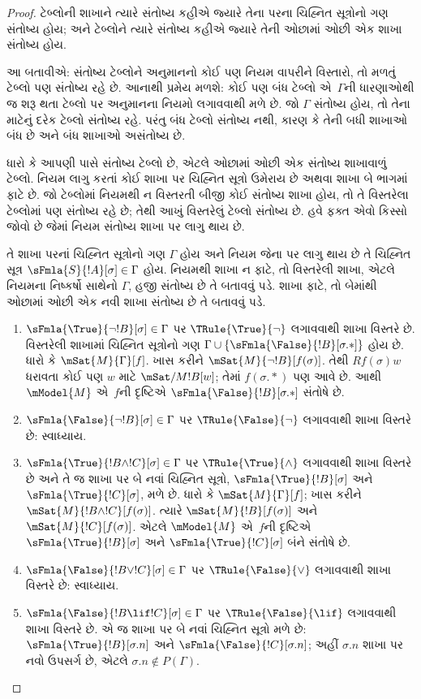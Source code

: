 \begin{proof}
ટેબ્લોની શાખાને ત્યારે સંતોષ્ય કહીએ જ્યારે
તેના પરના ચિહ્નિત સૂત્રોનો ગણ સંતોષ્ય હોય;
અને ટેબ્લોને ત્યારે સંતોષ્ય કહીએ જ્યારે
તેની ઓછામાં ઓછી એક શાખા સંતોષ્ય હોય.

આ બતાવીએ: સંતોષ્ય ટેબ્લોને અનુમાનનો કોઈ પણ
નિયમ વાપરીને વિસ્તારો, તો મળતું ટેબ્લો પણ
સંતોષ્ય રહે છે. આનાથી પ્રમેય મળશે: કોઈ પણ બંધ
ટેબ્લો એ~$\Gamma$ની ધારણાઓથી જ શરૂ થતા
ટેબ્લો પર અનુમાનના નિયમો લગાવવાથી મળે છે.
જો $\Gamma$ સંતોષ્ય હોય, તો તેના માટેનું દરેક
ટેબ્લો સંતોષ્ય રહે. પરંતુ બંધ ટેબ્લો
સંતોષ્ય નથી, કારણ કે તેની બધી શાખાઓ બંધ છે
અને બંધ શાખાઓ અસંતોષ્ય છે.

ધારો કે આપણી પાસે સંતોષ્ય ટેબ્લો છે,
એટલે ઓછામાં ઓછી એક સંતોષ્ય શાખાવાળું
ટેબ્લો. નિયમ લાગુ કરતાં કોઈ શાખા પર
ચિહ્નિત સૂત્રો ઉમેરાય છે અથવા શાખા
બે ભાગમાં ફાટે છે. જો ટેબ્લોમાં નિયમથી ન વિસ્તરતી
બીજી કોઈ સંતોષ્ય શાખા હોય, તો તે વિસ્તરેલા
ટેબ્લોમાં પણ સંતોષ્ય રહે છે; તેથી આખું
વિસ્તરેલું ટેબ્લો સંતોષ્ય છે. હવે ફક્ત એવો
કિસ્સો જોવો છે જેમાં નિયમ સંતોષ્ય શાખા પર
લાગુ થાય છે.

તે શાખા પરનાં ચિહ્નિત સૂત્રોનો ગણ
$\Gamma$ હોય અને નિયમ જેના પર લાગુ થાય છે તે
ચિહ્નિત સૂત્ર $\sFmla{S}{!A}[\sigma] \in \Gamma$
હોય. નિયમથી શાખા ન ફાટે, તો વિસ્તરેલી શાખા,
એટલે નિયમના નિષ્કર્ષો સાથેનો $\Gamma$,
હજી સંતોષ્ય છે તે બતાવવું પડે. શાખા ફાટે,
તો બેમાંથી ઓછામાં ઓછી એક નવી શાખા સંતોષ્ય
છે તે બતાવવું પડે.
\begin{enumerate}
\item $\sFmla{\True}{\lnot !B}[\sigma] \in \Gamma$
  પર $\TRule{\True}{\lnot}$ લગાવવાથી શાખા
  વિસ્તરે છે. વિસ્તરેલી શાખામાં
  ચિહ્નિત સૂત્રોનો ગણ $\Gamma \cup
  \{\sFmla{\False}{!B}[\sigma.{*}]\}$ હોય છે.
  ધારો કે $\mSat{M}{\Gamma}[f]$. ખાસ કરીને
  $\mSat{M}{\lnot !B}[f(\sigma)]$. તેથી
  $Rf(\sigma)w$ ધરાવતા કોઈ પણ $w$ માટે
  $\mSat/{M}{!B}[w]$; તેમાં $f(\sigma.{*})$
  પણ આવે છે. આથી $\mModel{M}$ એ~$f$ની
  દૃષ્ટિએ $\sFmla{\False}{!B}[\sigma.{*}]$
  સંતોષે છે.
\item $\sFmla{\False}{\lnot !B}[\sigma] \in \Gamma$
  પર $\TRule{\False}{\lnot}$ લગાવવાથી શાખા
  વિસ્તરે છે: સ્વાધ્યાય.
\item $\sFmla{\True}{!B \land !C}[\sigma] \in \Gamma$
  પર $\TRule{\True}{\land}$ લગાવવાથી શાખા
  વિસ્તરે છે અને તે જ શાખા પર બે નવાં
  ચિહ્નિત સૂત્રો, $\sFmla{\True}{!B}[\sigma]$
  અને $\sFmla{\True}{!C}[\sigma]$, મળે છે.
  ધારો કે $\mSat{M}{\Gamma}[f]$; ખાસ કરીને
  $\mSat{M}{!B \land !C}[f(\sigma)]$.
  ત્યારે $\mSat{M}{!B}[f(\sigma)]$ અને
  $\mSat{M}{!C}[f(\sigma)]$. એટલે
  $\mModel{M}$ એ~$f$ની દૃષ્ટિએ
  $\sFmla{\True}{!B}[\sigma]$ અને
  $\sFmla{\True}{!C}[\sigma]$ બંને સંતોષે છે.
\item $\sFmla{\False}{!B \lor !C}[\sigma] \in \Gamma$
  પર $\TRule{\False}{\lor}$ લગાવવાથી શાખા
  વિસ્તરે છે: સ્વાધ્યાય.
\item $\sFmla{\False}{!B \lif !C}[\sigma] \in \Gamma$
  પર $\TRule{\False}{\lif}$ લગાવવાથી શાખા
  વિસ્તરે છે. એ જ શાખા પર બે નવાં
  ચિહ્નિત સૂત્રો મળે છે:
  $\sFmla{\True}{!B}[\sigma.n]$ અને
  $\sFmla{\False}{!C}[\sigma.n]$; અહીં
  $\sigma.n$ શાખા પર નવો ઉપસર્ગ છે, એટલે
  $\sigma.n \notin P(\Gamma)$.


\end{enumerate}
\end{proof}
